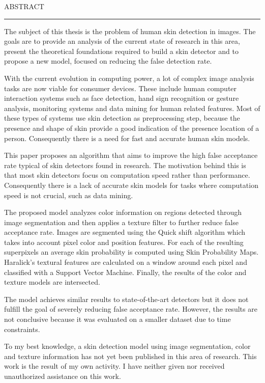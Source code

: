 \documentclass[12pt]{report}
\begin{document}
	\cleardoublepage
	ABSTRACT
	\vspace{0.5cm}	
	\hrule
	\vspace{0.5cm}	
	
	The subject of this thesis is the problem of human skin detection in images. The goals are to provide an analysis of the current state of research in this area, present the theoretical foundations required to build a skin detector and to propose a new model, focused on reducing the false detection rate.
	
	With the current evolution in computing power, a lot of complex image analysis tasks are now viable for consumer devices. These include human computer interaction systems such as face detection, hand sign recognition or gesture analysis, monitoring systems and data mining for human related features. Most of these types of systems use skin detection as preprocessing step, because the presence and shape of skin provide a good indication of the presence location of a person. Consequently there is a need for fast and accurate human skin models.
	
	This paper proposes an algorithm that aims to improve the high false acceptance rate typical of skin detectors found in research. The motivation behind this is that most skin detectors focus on computation speed rather than performance. Consequently there is a lack of accurate skin models for tasks where computation speed is not crucial, such as data mining.
	
	The proposed model analyzes color information on regions detected through image segmentation and then applies a texture filter to further reduce false acceptance rate. Images are segmented using the Quick shift algorithm which takes into account pixel color and position features. For each of the resulting superpixels an average skin probability is computed using Skin Probability Maps. Haralick's textural features are calculated on a window around each pixel and classified with a Support Vector Machine. Finally, the results of the color and texture models are intersected. 
	
	The model achieves similar results to state-of-the-art detectors but it does not fulfill the goal of severely reducing false acceptance rate. However, the results are not conclusive because it was evaluated on a smaller dataset due to time constraints.
	
	To my best knowledge, a skin detection model using image segmentation, color and texture information has not yet been published in this area of research. This work is the result of my own activity. I have neither given nor received unauthorized assistance on this work.
	
\end{document}

